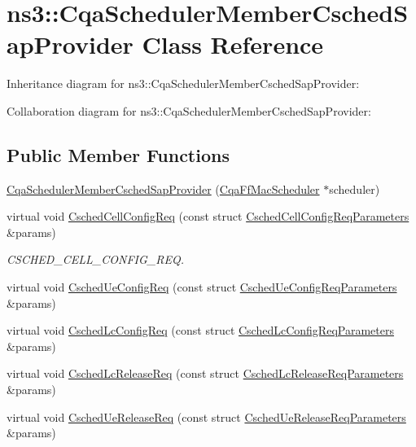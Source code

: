 \hypertarget{classns3_1_1CqaSchedulerMemberCschedSapProvider}{}\section{ns3\+:\+:Cqa\+Scheduler\+Member\+Csched\+Sap\+Provider Class Reference}
\label{classns3_1_1CqaSchedulerMemberCschedSapProvider}


Inheritance diagram for ns3\+:\+:Cqa\+Scheduler\+Member\+Csched\+Sap\+Provider\+:


Collaboration diagram for ns3\+:\+:Cqa\+Scheduler\+Member\+Csched\+Sap\+Provider\+:
\subsection*{Public Member Functions}
\begin{DoxyCompactItemize}
\item 
\hyperlink{classns3_1_1CqaSchedulerMemberCschedSapProvider_a6931d9b4b5763861e3d758bf2aa1f965}{Cqa\+Scheduler\+Member\+Csched\+Sap\+Provider} (\hyperlink{classns3_1_1CqaFfMacScheduler}{Cqa\+Ff\+Mac\+Scheduler} $\ast$scheduler)
\item 
virtual void \hyperlink{classns3_1_1CqaSchedulerMemberCschedSapProvider_ac7f54fc573178557c9d5342b61f238e5}{Csched\+Cell\+Config\+Req} (const struct \hyperlink{structns3_1_1FfMacCschedSapProvider_1_1CschedCellConfigReqParameters}{Csched\+Cell\+Config\+Req\+Parameters} \&params)
\begin{DoxyCompactList}\small\item\em C\+S\+C\+H\+E\+D\+\_\+\+C\+E\+L\+L\+\_\+\+C\+O\+N\+F\+I\+G\+\_\+\+R\+EQ. \end{DoxyCompactList}\item 
virtual void \hyperlink{classns3_1_1CqaSchedulerMemberCschedSapProvider_a60755159936c17f70a0956606eac13e8}{Csched\+Ue\+Config\+Req} (const struct \hyperlink{structns3_1_1FfMacCschedSapProvider_1_1CschedUeConfigReqParameters}{Csched\+Ue\+Config\+Req\+Parameters} \&params)
\item 
virtual void \hyperlink{classns3_1_1CqaSchedulerMemberCschedSapProvider_a834235aed1bdb5d2c1386c815b0f5715}{Csched\+Lc\+Config\+Req} (const struct \hyperlink{structns3_1_1FfMacCschedSapProvider_1_1CschedLcConfigReqParameters}{Csched\+Lc\+Config\+Req\+Parameters} \&params)
\item 
virtual void \hyperlink{classns3_1_1CqaSchedulerMemberCschedSapProvider_aa0789b8e4b4da38b874c5a0117ab503b}{Csched\+Lc\+Release\+Req} (const struct \hyperlink{structns3_1_1FfMacCschedSapProvider_1_1CschedLcReleaseReqParameters}{Csched\+Lc\+Release\+Req\+Parameters} \&params)
\item 
virtual void \hyperlink{classns3_1_1CqaSchedulerMemberCschedSapProvider_a60f00655fcd4cf90a0246b06f91d9b7f}{Csched\+Ue\+Release\+Req} (const struct \hyperlink{structns3_1_1FfMacCschedSapProvider_1_1CschedUeReleaseReqParameters}{Csched\+Ue\+Release\+Req\+Parameters} \&params)
\end{DoxyCompactItemize}
